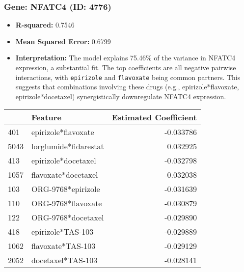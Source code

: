 \documentclass[12pt]{article}
\begin{document}
\subsubsection{Gene: NFATC4 (ID: 4776)}
\begin{itemize}
    \item \textbf{R-squared:} 0.7546
    \item \textbf{Mean Squared Error:} 0.6799
    \item \textbf{Interpretation:} The model explains 75.46\% of the variance in NFATC4 expression, a substantial fit. The top coefficients are all negative pairwise interactions, with \texttt{epirizole} and \texttt{flavoxate} being common partners. This suggests that combinations involving these drugs (e.g., epirizole*flavoxate, epirizole*docetaxel) synergistically downregulate NFATC4 expression.
\end{itemize}
\begin{tabularx}{\textwidth}{l X r}
\toprule
{} & Feature & Estimated Coefficient \\
\midrule
401 & epirizole*flavoxate & -0.033786 \\
5043 & lorglumide*fidarestat & 0.032925 \\
413 & epirizole*docetaxel & -0.032798 \\
1057 & flavoxate*docetaxel & -0.032038 \\
103 & ORG-9768*epirizole & -0.031639 \\
110 & ORG-9768*flavoxate & -0.030879 \\
122 & ORG-9768*docetaxel & -0.029890 \\
418 & epirizole*TAS-103 & -0.029889 \\
1062 & flavoxate*TAS-103 & -0.029129 \\
2052 & docetaxel*TAS-103 & -0.028141 \\
\bottomrule
\end{tabularx}
\end{document}
